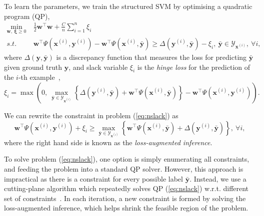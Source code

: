 To learn the parameters, we train the structured SVM by optimising a quadratic program (QP),
\begin{equation}
\label{eq:nslack}
\begin{aligned}
\min_{\mathbf{w}, ~\bm{\xi} \ge 0} ~& \frac{1}{2} \mathbf{w}^\top \mathbf{w} + \frac{C}{n} \sum_{i=1}^n \xi_i \\
s.t.~~ ~& \mathbf{w}^\top \Psi(\mathbf{x}^{(i)}, \mathbf{y}^{(i)}) - \mathbf{w}^\top \Psi(\mathbf{x}^{(i)}, \bar{\mathbf{y}}) \ge 
       \Delta(\mathbf{y}^{(i)}, \bar{\mathbf{y}}) - \xi_i, ~\bar{\mathbf{y}} \in \mathcal{Y}_{\mathbf{x}^{(i)}},~\forall i,
\end{aligned}
\end{equation}
where $\Delta(\mathbf{y}, \bar{\mathbf{y}})$ is a discrepancy function that measures the loss 
for predicting $\bar{\mathbf{y}}$ given ground truth $\mathbf{y}$, 
and slack variable $\xi_i$ is the \emph{hinge loss} for the prediction of the $i$-th example~\cite{tsochantaridis2005large},
\begin{equation*}
\xi_i = \max \left( 0,~ 
        \max_{\bar{\mathbf{y}} \in \mathcal{Y}_{\mathbf{x}^{(i)}}} 
        \left\{ \Delta(\mathbf{y}^{(i)}, \bar{\mathbf{y}}) + \mathbf{w}^\top \Psi(\mathbf{x}^{(i)}, \bar{\mathbf{y}}) \right\} -
        \mathbf{w}^\top \Psi(\mathbf{x}^{(i)}, \mathbf{y}^{(i)}) \right).
\end{equation*}

We can rewrite the constraint in problem (\ref{eq:nslack}) as
\begin{equation}
\label{eq:ssvminf}
\mathbf{w}^\top \Psi(\mathbf{x}^{(i)}, \mathbf{y}^{(i)}) + \xi_i \ge
          \max_{\bar{\mathbf{y}} \in \mathcal{Y}_{\mathbf{x}^{(i)}}}
          \left\{\mathbf{w}^\top \Psi(\mathbf{x}^{(i)}, \bar{\mathbf{y}}) + \Delta(\mathbf{y}^{(i)}, \bar{\mathbf{y}}) \right\},~ \forall i,
\end{equation}
where the right hand side is known as the \emph{loss-augmented inference}.

To solve problem (\ref{eq:nslack}), one option is simply enumerating all constraints, and feeding the problem into a standard QP solver.
However, this approach is impractical as there is a constraint for every possible label $\bar{\mathbf{y}}$.
Instead, we use a cutting-plane algorithm which repeatedly solves QP (\ref{eq:nslack}) 
w.r.t. different set of constraints~\cite{joachims2009predicting}.
In each iteration, a new constraint is formed by solving the loss-augmented inference, 
which helps shrink the feasible region of the problem.



